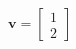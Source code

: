 \documentclass[preview]{standalone}
\begin{document}
\begin{align*}
\mathbf{v} = \begin{bmatrix} 1 \\ 2 \end{bmatrix}
\end{align*}
\end{document}
